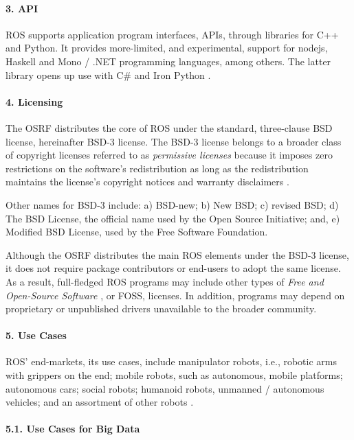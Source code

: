 \documentclass[9pt,twocolumn,twoside]{styles/osajnl}
\begin{document}
\paragraph{3. API}

ROS supports application program interfaces, APIs, through libraries for C++ and Python.  It provides more-limited, and experimental, support for nodejs, Haskell and Mono / .NET programming languages, among others.  The latter library opens up use with C\# and Iron Python \cite{www-ros-api}.

\paragraph{4. Licensing}

The OSRF distributes the core of ROS under the standard, three-clause BSD license, hereinafter BSD-3 license.  The BSD-3 license belongs to a broader class of copyright licenses referred to as \textit{permissive licenses} because it imposes zero restrictions on the software's redistribution as long as the redistribution maintains the license's copyright notices and warranty disclaimers \cite{www-wikipedia-bsd}.

Other names for BSD-3 include: a) BSD-new; b) New BSD; c) revised BSD; d) The BSD License, the official name used by the Open Source Initiative; and, e) Modified BSD License, used by the Free Software Foundation.

Although the OSRF distributes the main ROS elements under the BSD-3 license, it does not require package contributors or end-users to adopt the same license.  As a result, full-fledged ROS programs may include other types of \textit{Free and Open-Source Software} \cite{www-wiki-foss}, or FOSS, licenses.  In addition, programs may depend on proprietary or unpublished drivers unavailable to the broader community.

\paragraph{5. Use Cases}
ROS' end-markets, its use cases, include manipulator robots, i.e., robotic arms with grippers on the end; mobile robots, such as autonomous, mobile platforms; autonomous cars; social robots; humanoid robots, unmanned / autonomous vehicles; and an assortment of other robots \cite{www-ros-ecosystem}.


\paragraph{5.1. Use Cases for Big Data}
\end{document}
